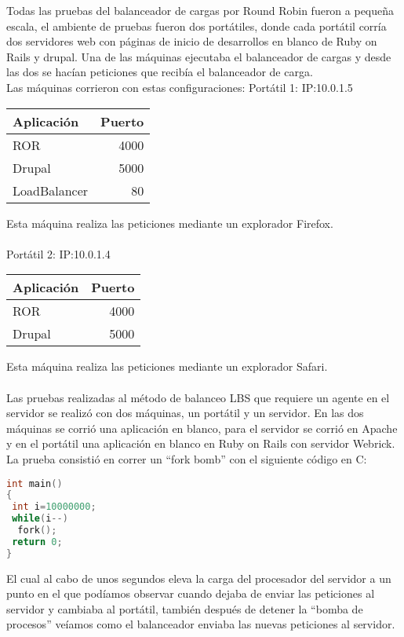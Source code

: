 Todas las pruebas del balanceador de cargas por Round Robin fueron a pequeña escala, el ambiente de pruebas fueron dos portátiles, donde cada
portátil corría dos servidores web con páginas de inicio de desarrollos en blanco de Ruby on Rails y drupal. Una de las máquinas ejecutaba el
balanceador de cargas y desde las dos se hacían peticiones que recibía el balanceador de carga.\\

Las máquinas corrieron con estas configuraciones:
Portátil 1: IP:10.0.1.5
\begin{center}
\begin{tabular}{ l r }
Aplicación & Puerto \\ \hline
ROR &  4000 \\
Drupal  & 5000\\
LoadBalancer & 80 \\
\end{tabular}
\end{center}
Esta máquina realiza las peticiones mediante un explorador Firefox.\\ \\

Portátil 2: IP:10.0.1.4
\begin{center}
\begin{tabular}{ l r }
Aplicación & Puerto \\ \hline
ROR  & 4000 \\
Drupal  & 5000\\
\end{tabular}
\end{center}
Esta máquina realiza las peticiones mediante un explorador Safari.\\ \\



Las pruebas realizadas al método de balanceo LBS que requiere un agente en el servidor se realizó con dos máquinas, un portátil y un servidor.
En las dos máquinas se corrió una aplicación en blanco, para el servidor se corrió en Apache y en el portátil una aplicación en blanco en Ruby on Rails
con servidor Webrick.\\
La prueba consistió en correr un ``fork bomb'' con el siguiente código en C:

\begin{lstlisting}[language=C]
int main()
{
 int i=10000000;
 while(i--)
  fork();
 return 0;
}
\end{lstlisting}

El cual al cabo de unos segundos eleva la carga del procesador del servidor a un punto en el que podíamos observar cuando dejaba de enviar las
peticiones al servidor y cambiaba al portátil, también después de detener la ``bomba de procesos'' veíamos como el balanceador enviaba las nuevas
peticiones al servidor.\\

